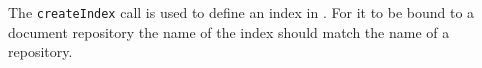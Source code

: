 The \verb+createIndex+ call is used to define an index in \Rapture. For it to be bound to
a document repository the name of the index should match the name of a repository.

